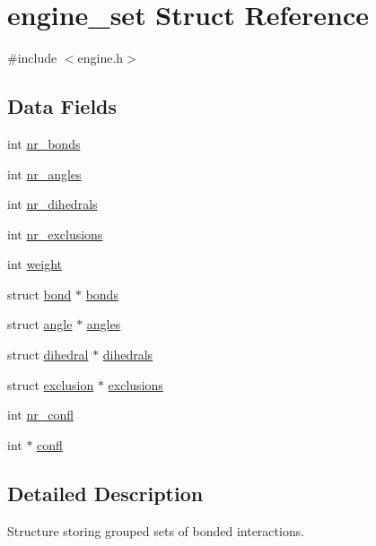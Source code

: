 \hypertarget{structengine__set}{\section{engine\-\_\-set Struct Reference}
\label{structengine__set}
}


{\ttfamily \#include $<$engine.\-h$>$}

\subsection*{Data Fields}
\begin{DoxyCompactItemize}
\item 
int \hyperlink{structengine__set_ad29e940869fdac422337511d82a22ae6}{nr\-\_\-bonds}
\item 
int \hyperlink{structengine__set_a03b0ba344cd1442d3d3975774eeea3e9}{nr\-\_\-angles}
\item 
int \hyperlink{structengine__set_a3ec4bdb694eae0871b24da3bc151294c}{nr\-\_\-dihedrals}
\item 
int \hyperlink{structengine__set_a56befbaa94d303065a80da7bec85acea}{nr\-\_\-exclusions}
\item 
int \hyperlink{structengine__set_aa01147b1f07072d246c76dc85d69df7c}{weight}
\item 
struct \hyperlink{structbond}{bond} $\ast$ \hyperlink{structengine__set_a8f2e5502792ec60f60f301d61cf8375d}{bonds}
\item 
struct \hyperlink{structangle}{angle} $\ast$ \hyperlink{structengine__set_ab28bf1df3e6849a71e5d02f6ddfab24e}{angles}
\item 
struct \hyperlink{structdihedral}{dihedral} $\ast$ \hyperlink{structengine__set_a069ad44663915a13f48a413d6edacee9}{dihedrals}
\item 
struct \hyperlink{structexclusion}{exclusion} $\ast$ \hyperlink{structengine__set_a799c04b928898b9f3f1e9e99fefc75c9}{exclusions}
\item 
int \hyperlink{structengine__set_ae8551c4c5c4f78983b2bcd01d5d6f6f9}{nr\-\_\-confl}
\item 
int $\ast$ \hyperlink{structengine__set_ad6bf2bd833a4dc250e5f7220f206f32d}{confl}
\end{DoxyCompactItemize}


\subsection{Detailed Description}
Structure storing grouped sets of bonded interactions. 

